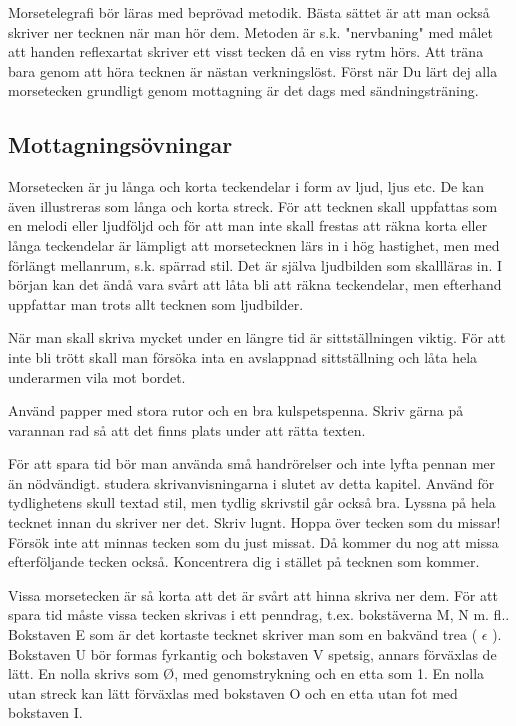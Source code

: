 \documentclass[a4paper,twoside,twocolumn,openright]{book}
\begin{document}
Morsetelegrafi bör läras med beprövad metodik. Bästa sättet är att man också skriver
ner tecknen när man hör dem. Metoden är s.k. "nervbaning" med målet att handen
reflexartat skriver ett visst tecken då en viss rytm hörs. Att träna bara genom att höra
tecknen är nästan verkningslöst. Först när Du lärt dej alla morsetecken grundligt genom
mottagning är det dags med sändningsträning.

\subsection{Mottagningsövningar}

Morsetecken är ju långa och korta teckendelar i form av ljud, ljus etc. De kan även
illustreras som långa och korta streck. För att tecknen skall uppfattas som en melodi
eller ljudföljd och för att man inte skall frestas att räkna korta eller långa
teckendelar är lämpligt att morsetecknen lärs in i hög hastighet, men med förlängt
mellanrum, s.k. spärrad stil. Det är själva ljudbilden som skallläras in.
I början kan det ändå vara svårt att låta bli att räkna teckendelar, men efterhand
uppfattar man trots allt tecknen som ljudbilder.

När man skall skriva mycket under en längre tid är sittställningen viktig. För att inte
bli trött skall man försöka inta en avslappnad sittställning och låta hela underarmen
vila mot bordet.

Använd papper med stora rutor och en bra kulspetspenna. Skriv gärna på varannan
rad så att det finns plats under att rätta texten.

För att spara tid bör man använda små handrörelser och inte lyfta pennan mer än
nödvändigt. studera skrivanvisningarna i slutet av detta kapitel. Använd för tydlighetens
skull textad stil, men tydlig skrivstil går också bra. Lyssna på hela tecknet innan du
skriver ner det. Skriv lugnt. Hoppa över tecken som du missar! Försök inte att minnas
tecken som du just missat. Då kommer du nog att missa efterföljande tecken också.
Koncentrera dig i stället på tecknen som kommer.

Vissa morsetecken är så korta att det är svårt att hinna skriva ner dem. För att spara
tid måste vissa tecken skrivas i ett penndrag, t.ex. bokstäverna M, N m. fl.. Bokstaven E
som är det kortaste tecknet skriver man som en bakvänd trea ( $\epsilon$ ). Bokstaven U
bör formas fyrkantig och bokstaven V spetsig, annars förväxlas de lätt. En nolla skrivs
som Ø, med genomstrykning och en etta som 1. En nolla utan streck kan lätt förväxlas med
bokstaven O och en etta utan fot med bokstaven I.
\end{document}
